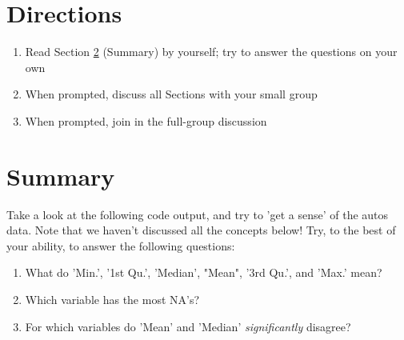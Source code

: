 \documentclass{article}
\begin{document}
\section{Directions}
\begin{enumerate}
\item Read Section \ref{sec:summary} (Summary) by yourself; try to answer the
  questions on your own
\item When prompted, discuss all Sections with your small group
\item When prompted, join in the full-group discussion
\end{enumerate}

\section{Summary} \label{sec:summary}
Take a look at the following code output, and try to 'get a sense' of the autos
data. Note that we haven't discussed all the concepts below! Try, to the best of
your ability, to answer the following questions:

\begin{enumerate}
\item What do 'Min.', '1st Qu.', 'Median', "Mean", '3rd Qu.', and 'Max.' mean?
\item Which variable has the most NA's?
\item For which variables do 'Mean' and 'Median' \emph{significantly} disagree?
\end{enumerate}
\end{document}

